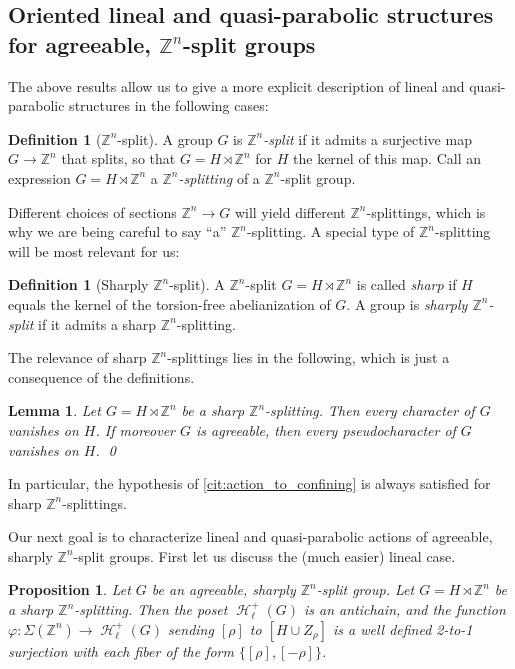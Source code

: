 \documentclass[reqno,12pt]{amsart}\setcounter{tocdepth}{1}
\newtheorem{lemma}[theorem]{Lemma}
\newtheorem{proposition}[theorem]{Proposition}
\theoremstyle{definition}
\newtheorem{definition}[theorem]{Definition}
\newcommand{\Z}{\mathbb{Z}}
\DeclareMathOperator{\Hyp}{\mathcal{H}}
\numberwithin{equation}{section}
\begin{document}
\subsection{Oriented lineal and quasi-parabolic structures for agreeable, $\Z^n$-split groups}\label{ssec:lin_qp}

The above results allow us to give a more explicit description of lineal and quasi-parabolic structures in the following cases:

\begin{definition}[$\Z^n$-split]
A group $G$ is \emph{$\Z^n$-split} if it admits a surjective map $G\to\Z^n$ that splits, so that $G=H\rtimes \Z^n$ for $H$ the kernel of this map. Call an expression $G=H\rtimes \Z^n$ a \emph{$\Z^n$-splitting} of a $\Z^n$-split group.
\end{definition}

Different choices of sections $\Z^n\to G$ will yield different $\Z^n$-splittings, which is why we are being careful to say ``a'' $\Z^n$-splitting. A special type of $\Z^n$-splitting will be most relevant for us:

\begin{definition}[Sharply $\Z^n$-split]
    A $\Z^n$-split $G = H \rtimes \Z^n$ is called \emph{sharp} if $H$ equals the kernel of the torsion-free abelianization of $G$. A group is \emph{sharply $\Z^n$-split} if it admits a sharp $\Z^n$-splitting.
\end{definition}

The relevance of sharp $\Z^n$-splittings lies in the following, which is just a consequence of the definitions.

\begin{lemma}\label{lem:sharp}
Let $G = H \rtimes \Z^n$ be a sharp $\Z^n$-splitting. Then every character of $G$ vanishes on $H$. If moreover $G$ is agreeable, then every pseudocharacter of $G$ vanishes on $H$. \qed
\end{lemma}

In particular, the hypothesis of \cref{cit:action_to_confining} is always satisfied for sharp $\Z^n$-splittings.

\medskip

Our next goal is to characterize lineal and quasi-parabolic actions of agreeable, sharply $\Z^n$-split groups. First let us discuss the (much easier) lineal case.

\begin{proposition}\label{prop:lineal}
Let $G$ be an agreeable, sharply $\Z^n$-split group. Let $G=H\rtimes\Z^n$ be a sharp $\Z^n$-splitting. Then the poset $\Hyp_\ell^+(G)$ is an antichain, and the function $\varphi \colon \Sigma(\Z^n)\to \Hyp_\ell^+(G)$ sending $[\rho]$ to $[H\cup Z_\rho]$ is a well defined 2-to-1 surjection with each fiber of the form $\{[\rho],[-\rho]\}$.
\end{proposition}
\end{document}
